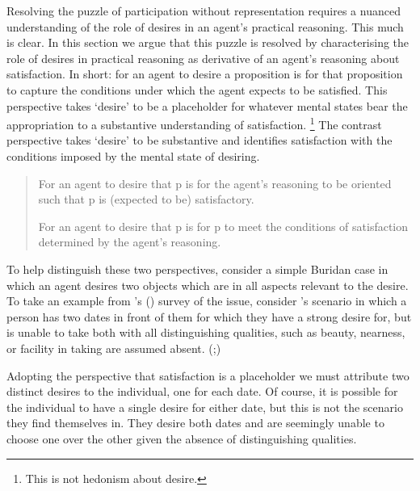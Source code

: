 \documentclass[10pt]{article}
\begin{document}
Resolving the puzzle of participation without representation requires a nuanced understanding of the role of desires in an agent's practical reasoning.
This much is clear.
In this section we argue that this puzzle is resolved by characterising the role of desires in practical reasoning as derivative of an agent's reasoning about satisfaction.
In short: for an agent to desire a proposition is for that proposition to capture the conditions under which the agent expects to be satisfied.
This perspective takes `desire' to be a placeholder for whatever mental states bear the appropriation to a substantive understanding of satisfaction.\nolinebreak
\footnote{\color{red} This is not hedonism about desire.}
The contrast perspective takes `desire' to be substantive and identifies satisfaction with the conditions imposed by the mental state of desiring.

\begin{quote}
  \begin{description}[style=unboxed, leftmargin=\parindent,labelindent=\parindent,font=\normalfont\bfseries\space]
  \item[Substantive-satisfaction] For an agent to desire that p is for the agent's reasoning to be oriented such that p is (expected to be) satisfactory.
  \item[Substantive-desire] For an agent to desire that p is for p to meet the conditions of satisfaction determined by the agent's reasoning.
  \end{description}
\end{quote}



To help distinguish these two perspectives, consider a simple Buridan case in which an agent desires two objects which are in all aspects relevant to the desire.
To take an example from \citeauthor{Rescher:1960aa}'s (\citeyear{Rescher:1960aa}) survey of the issue, consider \citeauthor{Al-Ghazali:1963aa}'s scenario in which a person has two dates in front of them for which they have a strong desire for, but is unable to take both with all distinguishing qualities, such as beauty, nearness, or facility in taking are assumed absent.
(\citeyear[26--27]{Al-Ghazali:1963aa};\citeyear[147--148]{Rescher:1960aa})

Adopting the perspective that satisfaction is a placeholder we must attribute two distinct desires to the individual, one for each date.
Of course, it is possible for the individual to have a single desire for either date, but this is not the scenario they find themselves in.
They desire both dates and are seemingly unable to choose one over the other given the absence of distinguishing qualities.
\end{document}
